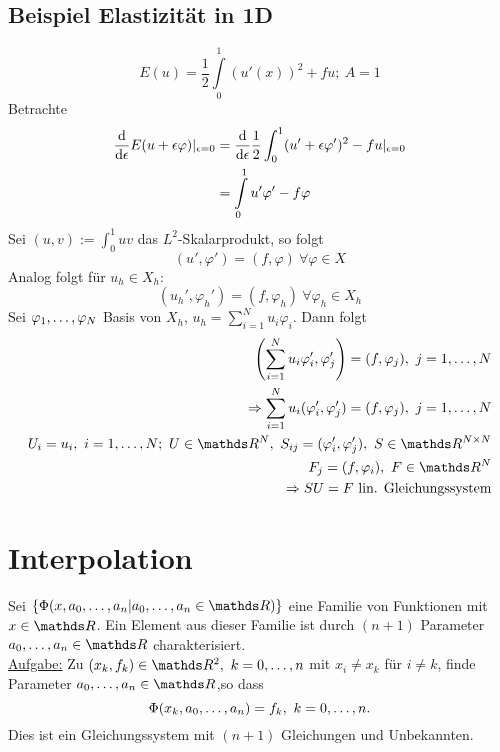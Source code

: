 \subsection{Beispiel Elastizität in 1D}
\label{sub:bsp_elastizitaet}
\[
E(u)= \frac{1}{2}\int\limits_{0}^{1}(u'(x))^2+ fu;~A=1
\]
Betrachte
\begin{equation*}
\begin{aligned}
	\frac{\mathrm{d}  }{\mathrm{d} \epsilon} E(u+\epsilon\varphi)|_{\epsilon=0} &= \frac{\mathrm{d}  }{\mathrm{d} \epsilon} \frac{1}{2}\int_{0}^{1}(u'+\epsilon\varphi')^2-fu|_{\epsilon=0}\\
	&= \int\limits_{0}^{1}u'\varphi'-f\varphi
\end{aligned}
\end{equation*}
Sei $(u,v):=\int_{0}^{1}uv$ das $L^2$-Skalarprodukt, so folgt
\[
(u',\varphi')=(f,\varphi)~\forall \varphi\in X
\]
Analog folgt für $u_h\in X_h$:
\[
(u_h',\varphi_h')=(f,\varphi_h)~\forall \varphi_h\in X_h
\]
Sei $\varphi_1, \dots ,\varphi_N$ Basis von $X_h$, $u_h=\sum_{i=1}^{N}u_i\varphi_i$.
Dann folgt
\begin{equation*}
\begin{aligned}
	\enbrace{\sum_{i=1}^{N}u_i\varphi_i',\varphi_j'}=(f,\varphi_j),~j=1\dt{,}N\\
	\Rightarrow \sum_{i=1}^{N}u_i(\varphi_i',\varphi_j')=(f,\varphi_j),~j=1\dt{,}N\\
	U_i=u_i,~i=1\dt{,}N;~U\in \R^N,~S_{ij}=(\varphi_i',\varphi_j'),~S\in \R^{N\times N}\\
	F_j=(f,\varphi_i),~F\in \R^N\\
	\Rightarrow SU=F \text{ lin. Gleichungssystem}
\end{aligned}
\end{equation*}
\section{Interpolation}
\label{sec:interpolation}
Sei $\penbrace{\Phi(x,a_0\dt{,}a_n|a_0\dt{,}a_n\in \R)}$ eine Familie von Funktionen mit $x\in \R$.
Ein Element aus dieser Familie ist durch $(n+1)$ Parameter $a_0\dt{,}a_n\in \R$ charakterisiert.\\
\uline{Aufgabe:} Zu $(x_k,f_k)\in \R^2,~k=0\dt{,}n$ mit $x_i\neq x_k$ für $i\neq k$, finde Parameter $a_0\dt{,}a_n\in \R$,so dass
\[
\Phi(x_k,a_0, \dots ,a_n)=f_k,~k=0, \dots ,n.
\]
Dies ist ein Gleichungssystem mit $(n+1)$ Gleichungen und Unbekannten.






























\cleardoubleoddemptypage
{}
\setcounter{page}{1}


\printindex
\listoffigures
